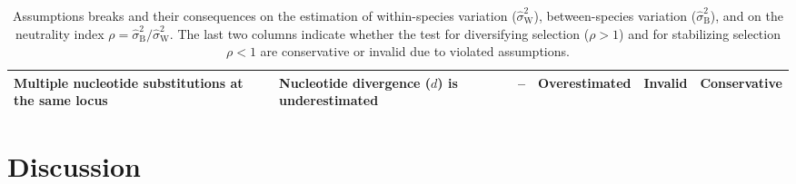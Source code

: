 \documentclass{article}
\newcommand{\EstRateBetween}{\widehat{\sigma}^2_{\mathrm{B}}} %
\newcommand{\EstRateWhithin}{\widehat{\sigma}^2_{\mathrm{W}}} %
\newcommand{\NI}{\rho}
\begin{document}
\begin{table}[t!]
\begin{adjustbox}{width = 1.0\textwidth}
\begin{tabular}{||l|l||c|c||c|c||}
            Multiple nucleotide substitutions at the same locus & Nucleotide divergence ($d$) is underestimated & -- & Overestimated & Invalid & Conservative  \\\hline \hline
        \end{tabular}
    \end{adjustbox}
    \caption{Assumptions breaks and their consequences on the estimation of within-species variation ($\EstRateWhithin$), between-species variation ($\EstRateBetween$), and on the neutrality index $\NI = \EstRateBetween/\EstRateWhithin$.
    The last two columns indicate whether the test for diversifying selection ($\NI > 1$) and for stabilizing selection $\NI < 1$ are conservative or invalid due to violated assumptions.
    }
    \label{table:assumptions}
\end{table}

\section*{Discussion}\label{sec:discussion}
\end{document}
